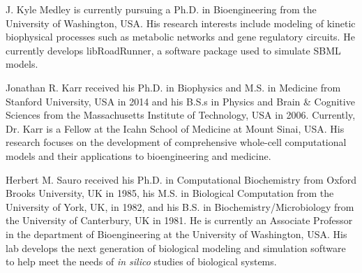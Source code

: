 \documentclass[journal,transmag]{IEEEtran}
\begin{document}



\begin{IEEEbiography}{J. Kyle Medley}
is currently pursuing a Ph.D. in Bioengineering from the University of Washington, USA.
His research interests include modeling of kinetic biophysical processes such as
metabolic networks and gene regulatory circuits.
He currently develops libRoadRunner, a software package used to simulate SBML models.
\end{IEEEbiography}

\begin{IEEEbiography}{Jonathan R. Karr}
received his Ph.D. in Biophysics and M.S. in Medicine from Stanford University, USA in 2014 and his B.S.s in Physics and Brain \& Cognitive Sciences from the Massachusetts Institute of Technology, USA in 2006. Currently, Dr. Karr is a Fellow at the Icahn School of Medicine at Mount Sinai, USA. His research focuses on the development of comprehensive whole-cell computational models and their applications to bioengineering and medicine.
\end{IEEEbiography}

\begin{IEEEbiography}{Herbert M. Sauro}
received his Ph.D. in Computational Biochemistry from Oxford Brooks University, UK in 1985, his M.S. in Biological Computation from the University of York, UK, in 1982, and his B.S. in Biochemistry/Microbiology from the University of Canterbury, UK in 1981. He is currently an Associate Professor in the department of Bioengineering at the University of Washington, USA. His lab develops the next generation of biological modeling and simulation software to help meet the needs of \textit{in silico} studies of biological systems.
\end{IEEEbiography}
\end{document}
